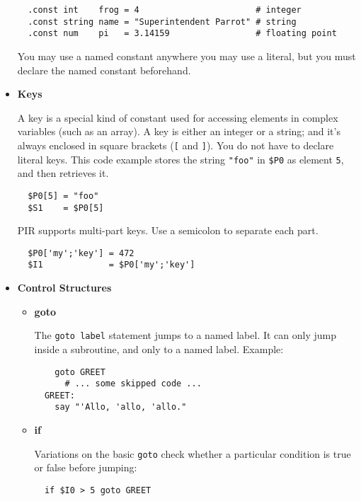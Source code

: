 \begin{itemize}
\begin{verbatim}
  .const int    frog = 4                       # integer
  .const string name = "Superintendent Parrot" # string
  .const num    pi   = 3.14159                 # floating point
\end{verbatim}

You may use a named constant anywhere you may use a literal, but
you must declare the named constant beforehand. 

\item {\bf Keys }

A key is a special kind of constant used for accessing elements in
complex variables (such as an array). A key is either an integer
or a string; and it's always enclosed in square brackets 
(\verb|[| and \verb|]|).
You do not have to declare literal keys. This code example stores
the string \verb|"foo"|
in \verb|$P0| as element \verb|5|, and then retrieves it.

\begin{verbatim}
  $P0[5] = "foo"
  $S1    = $P0[5]
\end{verbatim}

PIR supports multi-part keys. Use a semicolon to separate each part.

\begin{verbatim}
  $P0['my';'key'] = 472
  $I1             = $P0['my';'key']
\end{verbatim}

\item {\bf Control Structures }

\begin{itemize}
\item {\bf goto}

The \verb|goto label| statement 
jumps to a named label. It can only
jump inside a subroutine, and only to a named label. 
Example:

\begin{verbatim}
    goto GREET
      # ... some skipped code ...
  GREET:
    say "'Allo, 'allo, 'allo."
\end{verbatim}

\item {\bf if }

Variations on the basic \verb|goto| check whether a particular condition
is true or false before jumping:

\begin{verbatim}
  if $I0 > 5 goto GREET
\end{verbatim}
\end{itemize}


\end{itemize}
